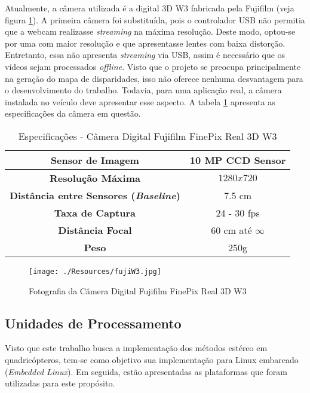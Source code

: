 Atualmente, a câmera utilizada é a digital 3D W3 fabricada pela Fujifilm (veja figura \ref{fujiW3}). A primeira câmera foi substituída, pois o controlador USB não permitia que a webcam realizasse \textit{streaming} na máxima resolução. Deste modo, optou-se por uma com maior resolução e que apresentasse lentes com baixa distorção. Entretanto, essa não apresenta \textit{streaming} via USB, assim é necessário que os vídeos sejam processados \textit{offline}. Visto que o projeto se preocupa principalmente na geração do mapa de disparidades, isso não oferece nenhuma desvantagem para o desenvolvimento do trabalho. Todavia, para uma aplicação real, a câmera instalada no veículo deve apresentar esse aspecto. A tabela \ref{fujiW3_tab} apresenta as especificações da câmera em questão.

\begin{table}[]
\centering
\caption{Especificações - Câmera Digital Fujifilm FinePix Real 3D W3}
\label{fujiW3_tab}
\begin{tabular}{|c|c|}
\hline
\textbf{Sensor de Imagem}      & 10 MP CCD Sensor  		\\	\hline
\textbf{Resolução Máxima}      & $1280x720$        		\\	\hline
\textbf{Distância entre Sensores (\textit{Baseline})} & 7.5 cm  \\	\hline
\textbf{Taxa de Captura}      & 24 - 30 fps          		\\	\hline
\textbf{Distância Focal}       & 60 cm até $\infty$		\\	\hline
\textbf{Peso}       		      & 250g			\\	\hline
\end{tabular}
\end{table}

\begin{figure}[H]
	\centering
	\texttt{[image: ./Resources/fujiW3.jpg]}
	\caption{Fotografia da Câmera Digital Fujifilm FinePix Real 3D W3}
	\label{fujiW3}
\end{figure}


\subsection{Unidades de Processamento}

Visto que este trabalho busca a implementação dos métodos estéreo em quadricópteros, tem-se como objetivo sua implementação para Linux embarcado (\textit{Embedded Linux}). Em seguida, estão apresentadas as plataformas que foram utilizadas para este propósito.


